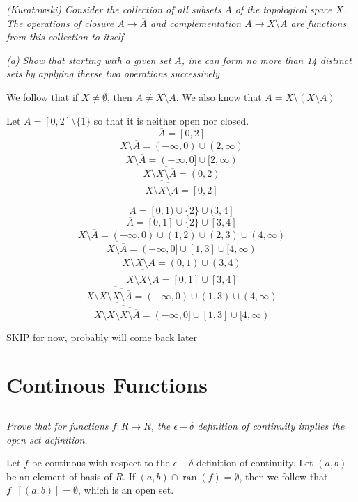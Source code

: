 \documentclass[11pt,oneside,titlepage]{book}
\DeclareMathOperator \inv {^{-1}}
\DeclareMathOperator \ran {ran}
\newcommand{\set}[1]{\{ #1 \}}
\begin{document}
\textit{(Kuratowski) Consider the collection of all subsets $A$ of the topological space $X$.
  The operations of closure $A \to \overline{A}$ and complementation $A \to X \setminus A$
  are functions from this collection to itself. }

\textit{(a) Show that starting with a given set $A$, ine can form no more than 14
  distinct sets by applying therse two operations successively.}

We follow that if $X \neq \emptyset$, then $A \neq X \setminus A$.
We also know that $A = X \setminus (X \setminus A)$

Let $A = [0, 2] \setminus \set{1}$ so that it is neither open nor closed.
$$\overline{A} = [0, 2]$$
$$X \setminus \overline{A} = (-\infty, 0) \cup (2, \infty)$$
$$\overline{X \setminus \overline{A}} = (-\infty, 0] \cup [2, \infty)$$
$$X \setminus \overline{X \setminus \overline{A}} = (0, 2)$$
$$\overline{X \setminus \overline{X \setminus \overline{A}}} = [0, 2]$$

$$A = [0, 1) \cup \set{2} \cup (3, 4]$$
$$\overline{A} = [0, 1] \cup \set{2} \cup [3, 4]$$
$$X \setminus \overline{A} = (-\infty, 0) \cup (1, 2) \cup (2, 3) \cup (4, \infty)$$
$$\overline{X \setminus \overline{A}} = (-\infty, 0] \cup [1, 3] \cup [4, \infty)$$
$$X \setminus \overline{X \setminus \overline{A}} = (0, 1) \cup (3, 4)$$
$$\overline{X \setminus \overline{X \setminus \overline{A}}} = [0, 1] \cup [3, 4]$$
$$X \setminus \overline{X \setminus \overline{X \setminus \overline{A}}} =
(-\infty, 0) \cup (1, 3)\cup (4, \infty)$$
$$\overline{X \setminus \overline{X \setminus \overline{X \setminus \overline{A}}}} =
(-\infty, 0] \cup [1, 3]\cup [4, \infty)$$

SKIP for now, probably will come back later

\section{Continous Functions}

\subsection{}

\textit{Prove that for functions $f: R \to R$, the $\epsilon-\delta$ definition of
  continuity implies the open set definition.}

Let $f$ be continous with respect to the $\epsilon-\delta$ definition of
continuity.
Let $(a, b)$ be an element of basis of $R$. If $(a, b) \cap \ran(f) = \emptyset$,
then we follow that  $f\inv[(a, b)] = \emptyset$, which is an open set.
\end{document}

